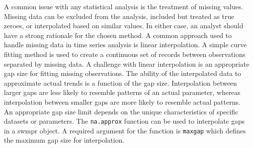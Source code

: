 \documentclass[10pt,letterpaper]{article}\usepackage[]{graphicx}\usepackage[]{color}
\begin{document}
A common issue with any statistical analysis is the treatment of missing values.  Missing data can be excluded from the analysis, included but treated as true zeroes, or interpolated based on similar values.  In either case, an analyst should have a strong rationale for the chosen method.  A common approach used to handle missing data in time series analysis is linear interpolation.  A simple curve fitting method is used to create a continuous set of records between observations separated by missing data.  A challenge with linear interpolation is an appropriate gap size for fitting missing observations.  The ability of the interpolated data to approximate actual trends is a function of the gap size.  Interpolation between larger gaps are less likely to resemble patterns of an actual parameter, whereas interpolation between smaller gaps are more likely to resemble actual patterns.  An appropriate gap size limit depends on the unique characteristics of specific datasets or parameters.  The \texttt{na.approx} function can be used to interpolate gaps in a swmpr object.  A required argument for the function is \texttt{maxgap} which defines the maximum gap size  for interpolation.
\end{document}
